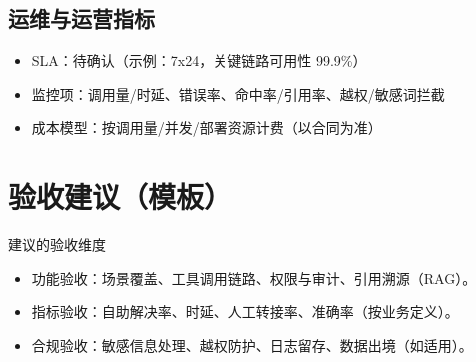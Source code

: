\documentclass[UTF8,a4paper,11pt,fontset=fandol]{ctexart}
\begin{document}
\subsection{运维与运营指标}
\begin{itemize}[leftmargin=2.2em]
  \item SLA：待确认（示例：7x24，关键链路可用性 99.9\%）
  \item 监控项：调用量/时延、错误率、命中率/引用率、越权/敏感词拦截
  \item 成本模型：按调用量/并发/部署资源计费（以合同为准）
\end{itemize}

\section{验收建议（模板）}
\begin{infobox}{建议的验收维度}
\begin{itemize}[leftmargin=2.2em]
  \item 功能验收：场景覆盖、工具调用链路、权限与审计、引用溯源（RAG）。
  \item 指标验收：自助解决率、时延、人工转接率、准确率（按业务定义）。
  \item 合规验收：敏感信息处理、越权防护、日志留存、数据出境（如适用）。
\end{itemize}
\end{infobox}
\end{document}
